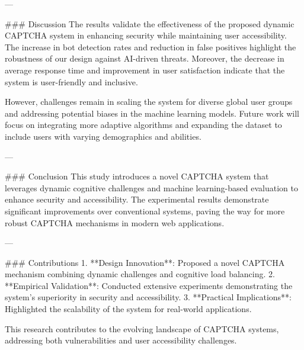 ---

### Discussion  
The results validate the effectiveness of the proposed dynamic CAPTCHA system in enhancing security while maintaining user accessibility. The increase in bot detection rates and reduction in false positives highlight the robustness of our design against AI-driven threats. Moreover, the decrease in average response time and improvement in user satisfaction indicate that the system is user-friendly and inclusive.  

However, challenges remain in scaling the system for diverse global user groups and addressing potential biases in the machine learning models. Future work will focus on integrating more adaptive algorithms and expanding the dataset to include users with varying demographics and abilities.

---

### Conclusion  
This study introduces a novel CAPTCHA system that leverages dynamic cognitive challenges and machine learning-based evaluation to enhance security and accessibility. The experimental results demonstrate significant improvements over conventional systems, paving the way for more robust CAPTCHA mechanisms in modern web applications.

---

### Contributions  
1. **Design Innovation**: Proposed a novel CAPTCHA mechanism combining dynamic challenges and cognitive load balancing.  
2. **Empirical Validation**: Conducted extensive experiments demonstrating the system's superiority in security and accessibility.  
3. **Practical Implications**: Highlighted the scalability of the system for real-world applications.  

This research contributes to the evolving landscape of CAPTCHA systems, addressing both vulnerabilities and user accessibility challenges.